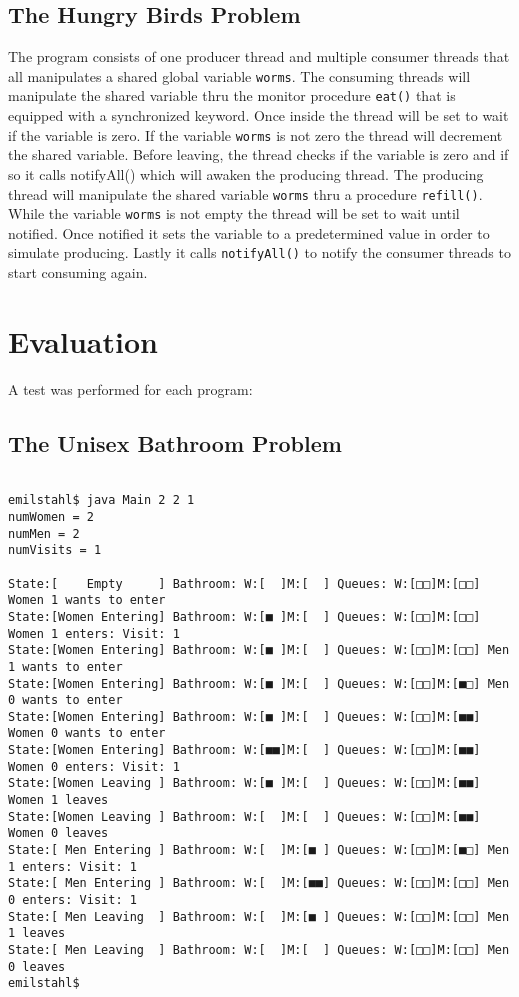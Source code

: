 \documentclass{article}
\begin{document}
\subsection{The Hungry Birds Problem}

The program consists of one producer thread and multiple consumer threads that all manipulates a shared global variable \texttt{worms}. The consuming threads will manipulate the shared variable thru the monitor procedure \texttt{eat()} that is equipped with a synchronized keyword. Once inside the thread will be set to wait if the variable is zero. If the variable \texttt{worms} is not zero the thread will decrement the shared variable. Before leaving, the thread checks if the variable is zero and if so it calls notifyAll() which will awaken the producing thread. 
The producing thread will manipulate the shared variable \texttt{worms} thru a procedure \texttt{refill()}. While the variable \texttt{worms} is not empty the thread will be set to wait until notified. Once notified it sets the variable to a predetermined value in order to simulate producing. Lastly it calls \texttt{notifyAll()} to notify the consumer threads to start consuming again. 


\clearpage
\section{Evaluation}

A test was performed for each program:

\subsection{The Unisex Bathroom Problem}
\begin{verbatim}

emilstahl$ java Main 2 2 1
numWomen = 2
numMen = 2
numVisits = 1

State:[    Empty     ] Bathroom: W:[  ]M:[  ] Queues: W:[□□]M:[□□] Women 1 wants to enter
State:[Women Entering] Bathroom: W:[■ ]M:[  ] Queues: W:[□□]M:[□□] Women 1 enters: Visit: 1
State:[Women Entering] Bathroom: W:[■ ]M:[  ] Queues: W:[□□]M:[□□] Men 1 wants to enter
State:[Women Entering] Bathroom: W:[■ ]M:[  ] Queues: W:[□□]M:[■□] Men 0 wants to enter
State:[Women Entering] Bathroom: W:[■ ]M:[  ] Queues: W:[□□]M:[■■] Women 0 wants to enter
State:[Women Entering] Bathroom: W:[■■]M:[  ] Queues: W:[□□]M:[■■] Women 0 enters: Visit: 1
State:[Women Leaving ] Bathroom: W:[■ ]M:[  ] Queues: W:[□□]M:[■■] Women 1 leaves
State:[Women Leaving ] Bathroom: W:[  ]M:[  ] Queues: W:[□□]M:[■■] Women 0 leaves
State:[ Men Entering ] Bathroom: W:[  ]M:[■ ] Queues: W:[□□]M:[■□] Men 1 enters: Visit: 1
State:[ Men Entering ] Bathroom: W:[  ]M:[■■] Queues: W:[□□]M:[□□] Men 0 enters: Visit: 1
State:[ Men Leaving  ] Bathroom: W:[  ]M:[■ ] Queues: W:[□□]M:[□□] Men 1 leaves
State:[ Men Leaving  ] Bathroom: W:[  ]M:[  ] Queues: W:[□□]M:[□□] Men 0 leaves
emilstahl$ 
\end{verbatim}
\clearpage
\end{document}
